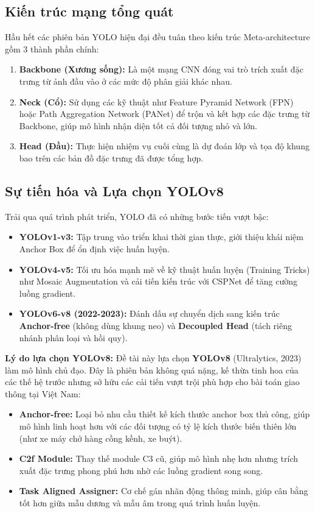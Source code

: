 \subsection{Kiến trúc mạng tổng quát}

Hầu hết các phiên bản YOLO hiện đại đều tuân theo kiến trúc Meta-architecture gồm 3 thành phần chính:
\begin{enumerate}
    \item \textbf{Backbone (Xương sống):} Là một mạng CNN đóng vai trò trích xuất đặc trưng từ ảnh đầu vào ở các mức độ phân giải khác nhau.
    \item \textbf{Neck (Cổ):} Sử dụng các kỹ thuật như Feature Pyramid Network (FPN) hoặc Path Aggregation Network (PANet) để trộn và kết hợp các đặc trưng từ Backbone, giúp mô hình nhận diện tốt cả đối tượng nhỏ và lớn.
    \item \textbf{Head (Đầu):} Thực hiện nhiệm vụ cuối cùng là dự đoán lớp và tọa độ khung bao trên các bản đồ đặc trưng đã được tổng hợp.
\end{enumerate}

\subsection{Sự tiến hóa và Lựa chọn YOLOv8}
Trải qua quá trình phát triển, YOLO đã có những bước tiến vượt bậc:
\begin{itemize}
    \item \textbf{YOLOv1-v3:} Tập trung vào triển khai thời gian thực, giới thiệu khái niệm Anchor Box để ổn định việc huấn luyện.
    \item \textbf{YOLOv4-v5:} Tối ưu hóa mạnh mẽ về kỹ thuật huấn luyện (Training Tricks) như Mosaic Augmentation và cải tiến kiến trúc với CSPNet để tăng cường luồng gradient.
    \item \textbf{YOLOv6-v8 (2022-2023):} Đánh dấu sự chuyển dịch sang kiến trúc \textbf{Anchor-free} (không dùng khung neo) và \textbf{Decoupled Head} (tách riêng nhánh phân loại và hồi quy).
\end{itemize}

\textbf{Lý do lựa chọn YOLOv8:}
Đề tài này lựa chọn \textbf{YOLOv8} (Ultralytics, 2023) làm mô hình chủ đạo. Đây là phiên bản không quá nặng, kế thừa tinh hoa của các thế hệ trước nhưng sở hữu các cải tiến vượt trội phù hợp cho bài toán giao thông tại Việt Nam:
\begin{itemize}
    \item \textbf{Anchor-free:} Loại bỏ nhu cầu thiết kế kích thước anchor box thủ công, giúp mô hình linh hoạt hơn với các đối tượng có tỷ lệ kích thước biến thiên lớn (như xe máy chở hàng cồng kềnh, xe buýt).
    \item \textbf{C2f Module:} Thay thế module C3 cũ, giúp mô hình nhẹ hơn nhưng trích xuất đặc trưng phong phú hơn nhờ các luồng gradient song song.
    \item \textbf{Task Aligned Assigner:} Cơ chế gán nhãn động thông minh, giúp cân bằng tốt hơn giữa mẫu dương và mẫu âm trong quá trình huấn luyện.
\end{itemize}


